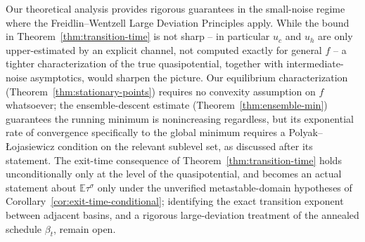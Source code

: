 \documentclass{article} %
\theoremstyle{plain}
\theoremstyle{definition}
\theoremstyle{remark}
\newcommand{\E}{\mathbb{E}}
\begin{document}
Our theoretical analysis provides rigorous guarantees in the small-noise regime where the Freidlin--Wentzell Large Deviation Principles apply. While the bound in Theorem~\ref{thm:transition-time} is not sharp -- in particular $u_c$ and $u_h$ are only upper-estimated by an explicit channel, not computed exactly for general $f$ -- a tighter characterization of the true quasipotential, together with intermediate-noise asymptotics, would sharpen the picture. Our equilibrium characterization (Theorem~\ref{thm:stationary-points}) requires no convexity assumption on $f$ whatsoever; the ensemble-descent estimate (Theorem~\ref{thm:ensemble-min}) guarantees the running minimum is nonincreasing regardless, but its exponential rate of convergence specifically to the global minimum requires a Polyak–\L{}ojasiewicz condition on the relevant sublevel set, as discussed after its statement. The exit-time consequence of Theorem~\ref{thm:transition-time} holds unconditionally only at the level of the quasipotential, and becomes an actual statement about $\E\tau^\sigma$ only under the unverified metastable-domain hypotheses of Corollary~\ref{cor:exit-time-conditional}; identifying the exact transition exponent between adjacent basins, and a rigorous large-deviation treatment of the annealed schedule $\beta_t$, remain open.
\end{document}
